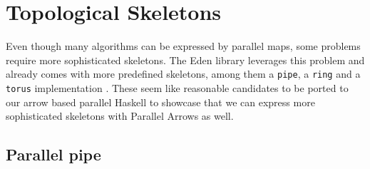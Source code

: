 \documentclass{jfp1}
\renewcommand{\cite}[1]{\citep{#1}}
\newcommand{\inlinecode}[1]{\texttt{#1}}
\begin{document}
\section{Topological Skeletons}
\label{sec:topology-skeletons}
Even though many algorithms can be expressed by parallel maps, some problems require more sophisticated skeletons. The Eden library leverages this problem and already comes with more predefined skeletons, among them a \inlinecode{pipe}, a \inlinecode{ring} and a \inlinecode{torus} implementation \cite{Loogen2012, eden_skel_topology}. These seem like reasonable candidates to be ported to our arrow based parallel Haskell to showcase that we can express more sophisticated skeletons with Parallel Arrows as well.

\subsection{Parallel pipe}
\end{document}
